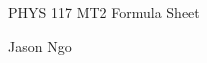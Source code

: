 \documentclass[letterpaper]{article}
\begin{document}
PHYS 117 MT2 Formula Sheet

Jason Ngo
\end{document}
